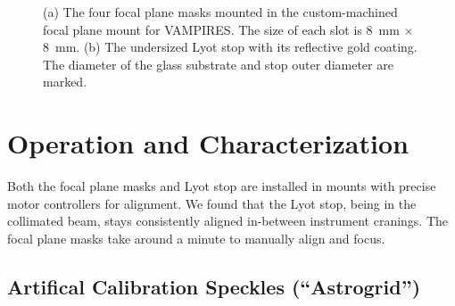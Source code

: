 \documentclass[]{spie}  %
\begin{document}
\begin{figure}
   \centering
   \hspace{0.5in}
   \caption{(a) The four focal plane masks mounted in the custom-machined focal plane mount for VAMPIRES. The size of each slot is \qty{8}{\milli\meter} $\times$ \qty{8}{\milli\meter}. (b) The undersized Lyot stop with its reflective gold coating. The diameter of the glass substrate and stop outer diameter are marked.}\label{fig:optics}
\end{figure}

\section{Operation and Characterization}\label{sec:tests}

Both the focal plane masks and Lyot stop are installed in mounts with precise motor controllers for alignment. We found that the Lyot stop, being in the collimated beam, stays consistently aligned in-between instrument cranings. The focal plane masks take around a minute to manually align and focus.

\subsection{Artifical Calibration Speckles (``Astrogrid'')}
\end{document}
